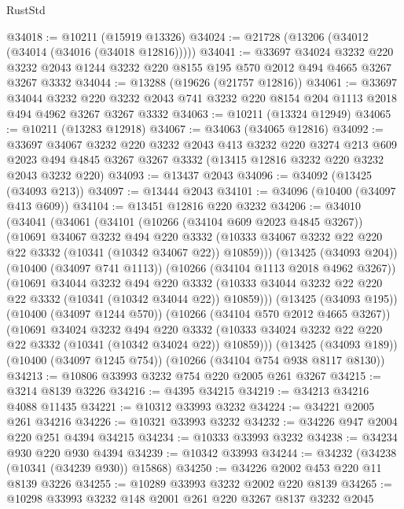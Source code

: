 \begin{lexlean}{RustStd}
\begin{coremodule}
{\begin{coremodule}
{{{{{{{{{{{{{{{{{{{{{{{{{@34018 := @10211 (@15919 @13326)
@34024 := @21728 (@13206 (@34012 (@34014 (@34016 (@34018 @12816)))))
@34041 := @33697
    @34024
    @3232
    @220
    @3232
    @2043
    @1244
    @3232
    @220
    @8155
    @195
    @570
    @2012
    @494
    @4665
    @3267
    @3267
    @3332
@34044 := @13288 (@19626 (@21757 @12816))
@34061 := @33697
    @34044
    @3232
    @220
    @3232
    @2043
    @741
    @3232
    @220
    @8154
    @204
    @1113
    @2018
    @494
    @4962
    @3267
    @3267
    @3332
@34063 := @10211 (@13324 @12949)
@34065 := @10211 (@13283 @12918)
@34067 := @34063 (@34065 @12816)
@34092 := @33697
    @34067
    @3232
    @220
    @3232
    @2043
    @413
    @3232
    @220
    @3274
    @213
    @609
    @2023
    @494
    @4845
    @3267
    @3267
    @3332
    (@13415 @12816 @3232 @220 @3232 @2043 @3232 @220)
@34093 := @13437 @2043
@34096 := @34092 (@13425 (@34093 @213))
@34097 := @13444 @2043
@34101 := @34096 (@10400 (@34097 @413 @609))
@34104 := @13451 @12816 @220 @3232
@34206 := @34010
    (@34041
      (@34061
        (@34101
          (@10266 (@34104 @609 @2023 @4845 @3267))
          (@10691
            @34067
            @3232
            @494
            @220
            @3332
            (@10333 @34067 @3232 @22 @220 @22 @3332 (@10341 (@10342 @34067 @22)) @10859)))
        (@13425 (@34093 @204))
        (@10400 (@34097 @741 @1113))
        (@10266 (@34104 @1113 @2018 @4962 @3267))
        (@10691
          @34044
          @3232
          @494
          @220
          @3332
          (@10333 @34044 @3232 @22 @220 @22 @3332 (@10341 (@10342 @34044 @22)) @10859)))
      (@13425 (@34093 @195))
      (@10400 (@34097 @1244 @570))
      (@10266 (@34104 @570 @2012 @4665 @3267))
      (@10691
        @34024
        @3232
        @494
        @220
        @3332
        (@10333 @34024 @3232 @22 @220 @22 @3332 (@10341 (@10342 @34024 @22)) @10859)))
    (@13425 (@34093 @189))
    (@10400 (@34097 @1245 @754))
    (@10266 (@34104 @754 @938 @8117 @8130))
@34213 := @10806 @33993 @3232 @754 @220 @2005 @261 @3267
@34215 := @3214 @8139 @3226
@34216 := @4395 @34215
@34219 := @34213 @34216 @4088 @11435
@34221 := @10312 @33993 @3232
@34224 := @34221 @2005 @261 @34216
@34226 := @10321 @33993 @3232
@34232 := @34226 @947 @2004 @220 @251 @4394 @34215
@34234 := @10333 @33993 @3232
@34238 := @34234 @930 @220 @930 @4394
@34239 := @10342 @33993
@34244 := @34232 (@34238 (@10341 (@34239 @930)) @15868)
@34250 := @34226 @2002 @453 @220 @11 @8139 @3226
@34255 := @10289 @33993 @3232 @2002 @220 @8139
@34265 := @10298 @33993 @3232 @148 @2001 @261 @220 @3267 @8137 @3232 @2045
}}}}}}}}}}}}}}}}}}}}}}}}}
\end{coremodule}}
\end{coremodule}
\end{lexlean}

